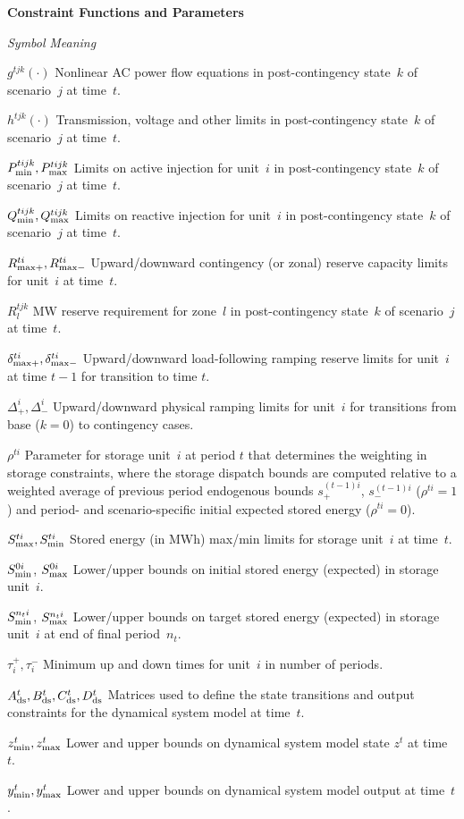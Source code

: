 \documentclass[12pt]{article}
\newcommand{\namelistlabel}[1]{\mbox{#1}\hfil}
\newenvironment{namelist}[1]{%
\begin{list}{}
  {
    \let\makelabel\namelistlabel
    \settowidth{\labelwidth}{#1}
    \setlength{\leftmargin}{1.1\labelwidth}
  }
 }{%
\end{list}}
\numberwithin{equation}{section}
\numberwithin{table}{section}
\numberwithin{figure}{section}
\begin{document}
\begin{namelist}{XXXXXXXXXX}
\item[]
\item[{\bf Constraint Functions and Parameters}]
\item[\emph{Symbol}] \emph{Meaning}
\item[$g^{tjk}(\cdot)$] Nonlinear AC power flow equations in post-contingency state~$k$ of scenario~$j$ at time~$t$.
\item[$h^{tjk}(\cdot)$] Transmission, voltage and other limits in post-contingency state~$k$ of scenario~$j$ at time~$t$.
\item[$P_{\rm min}^{tijk}, P_{\rm max}^{tijk}$] Limits on active injection for unit~$i$ in post-contingency state~$k$ of scenario~$j$ at time~$t$.
\item[$Q_{\rm min}^{tijk}, Q_{\rm max}^{tijk}$] Limits on reactive injection for unit~$i$ in post-contingency state~$k$ of scenario~$j$ at time~$t$.
\item[$R_{\rm max+}^{ti}, R_{\rm max-}^{ti}$] Upward/downward contingency (or zonal) reserve capacity limits for unit~$i$ at time~$t$.
\item[$R_l^{tjk}$] MW reserve requirement for zone~$l$ in post-contingency state~$k$ of scenario~$j$ at time~$t$.
\item[$\delta^{ti}_{\rm max+}, \delta^{ti}_{\rm max-}$] Upward/downward load-following ramping reserve limits for unit~$i$ at time $t-1$ for transition to time $t$.
\item[$\Delta_+^i, \Delta_-^i$] Upward/downward physical ramping limits for unit~$i$ for transitions from base ($k=0$) to contingency cases.
\item[$\rho^{ti}$] Parameter for storage unit~$i$ at period $t$ that determines the weighting in storage constraints, where the storage dispatch bounds are computed relative to a weighted average of previous period endogenous bounds $s_+^{(t-1)i}$, $s_-^{(t-1)i}$ ($\rho^{ti} = 1$) and period- and scenario-specific initial expected stored energy ($\rho^{ti} = 0$).
\item[$S^{ti}_{\rm max},S^{ti}_{\rm min}$] Stored energy (in MWh) max/min limits for storage unit~$i$ at time~$t$.
\item[$S_{\rm min}^{0i}$, $S_{\rm max}^{0i}$] Lower/upper bounds on initial stored energy (expected) in storage unit~$i$.
\item[$S_{\rm min}^{n_ti}$, $S_{\rm max}^{n_ti}$] Lower/upper bounds on target stored energy (expected) in storage unit~$i$ at end of final period~$n_t$.
\item[$\tau_i^+, \tau_i^-$] Minimum up and down times for unit~$i$ in number of periods.
\item[$A_{\rm ds}^t, B_{\rm ds}^t, C_{\rm ds}^t, D_{\rm ds}^t$] Matrices used to define the state transitions and output constraints for the dynamical system model at time~$t$.
\item[$z_{\rm min}^t, z_{\rm max}^t$] Lower and upper bounds on dynamical system model state $z^t$ at time~$t$.
\item[$y_{\rm min}^t, y_{\rm max}^t$] Lower and upper bounds on dynamical system model output at time~$t$.


\end{namelist}
\end{document}
